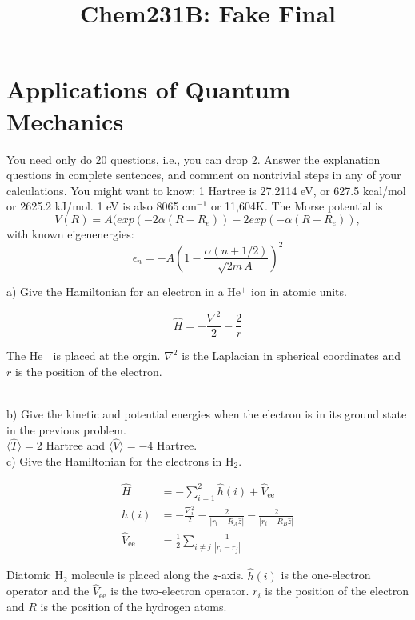 \documentclass{article}
\title{Chem231B: Fake Final} %
\begin{document}
\maketitle

\section*{Applications of Quantum Mechanics}

You need only do 20 questions, i.e., you can drop 2. Answer the explanation questions in complete
sentences, and comment on nontrivial steps in any of your calculations. You might want to know:
1 Hartree is 27.2114 eV, or 627.5 kcal/mol or 2625.2 kJ/mol. 1 eV is also 8065 cm$^{-1}$ or 11,604K.
The Morse potential is
\begin{equation}
  V(R) = A(exp(-2\alpha(R-R_e))-2exp(-\alpha(R-R_e)),
\end{equation}
with known eigenenergies:
\begin{equation}
  \epsilon_n = -A(1 - \frac{\alpha(n+1/2)}{\sqrt{2m\,A}})^2
\end{equation}

\noindent a) Give the Hamiltonian for an electron in a He$^+$ ion in atomic units.

{\color{blue}
  \begin{equation}
    \hat{H} = -\frac{\nabla^2}{2} - \frac{2}{r}
  \end{equation}

  The He$^+$ is placed at the orgin. $\nabla^2$ is the Laplacian in spherical coordinates and
  $r$ is the position of the electron.
}
\\

\noindent b) Give the kinetic and potential energies when the electron is in its ground state
in the previous problem.
\\

{\color{blue} $\langle \hat{T} \rangle = 2$ Hartree and $\langle \hat{V} \rangle = -4$ Hartree.}
\\

\noindent c) Give the Hamiltonian for the electrons in H$_2$.

{\color{blue}
  \begin{align*}
    \hat{H} & = -\sum_{i=1}^2\hat{h}(i) + \hat{V}_{\text{ee}} \\
    \hat{h}(i) & = -\frac{\nabla_i^2}{2} - \frac{2}{|r_i-R_A\hat{z}|} -\frac{2}{|r_i - R_B\hat{z}|} \\
    \hat{V}_{\text{ee}} & = \frac{1}{2}\sum_{i\neq j} \frac{1}{|r_i-r_j|}
  \end{align*}

  Diatomic H$_2$ molecule is placed along the $z$-axis. $\hat{h}(i)$ is the one-electron
  operator and the $\hat{V}_{\text{ee}}$ is the two-electron operator. $r_i$ is the position
  of the electron and $R$ is the position of the hydrogen atoms.
}
\\
\end{document}
